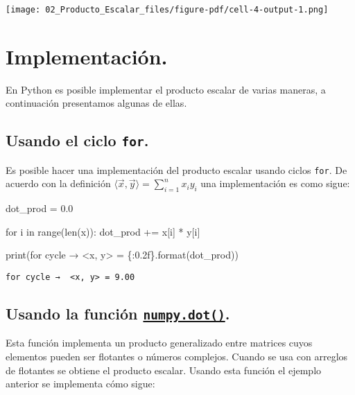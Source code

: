\documentclass[
  letterpaper,
  DIV=11,
  numbers=noendperiod]{scrreprt}
\newenvironment{Shaded}{\begin{snugshade}}{\end{snugshade}}
\newcommand{\BuiltInTok}[1]{\textcolor[rgb]{0.00,0.23,0.31}{#1}}
\newcommand{\ControlFlowTok}[1]{\textcolor[rgb]{0.00,0.23,0.31}{#1}}
\newcommand{\FloatTok}[1]{\textcolor[rgb]{0.68,0.00,0.00}{#1}}
\newcommand{\KeywordTok}[1]{\textcolor[rgb]{0.00,0.23,0.31}{#1}}
\newcommand{\NormalTok}[1]{\textcolor[rgb]{0.00,0.23,0.31}{#1}}
\newcommand{\OperatorTok}[1]{\textcolor[rgb]{0.37,0.37,0.37}{#1}}
\newcommand{\SpecialCharTok}[1]{\textcolor[rgb]{0.37,0.37,0.37}{#1}}
\newcommand{\StringTok}[1]{\textcolor[rgb]{0.13,0.47,0.30}{#1}}
\begin{document}
\texttt{[image: 02\_Producto\_Escalar\_files/figure-pdf/cell-4-output-1.png]}

\section{Implementación.}\label{implementaciuxf3n.}

En Python es posible implementar el producto escalar de varias maneras,
a continuación presentamos algunas de ellas.

\subsection{\texorpdfstring{Usando el ciclo
\texttt{for}.}{Usando el ciclo for.}}\label{usando-el-ciclo-for.}

Es posible hacer una implementación del producto escalar usando ciclos
\texttt{for}. De acuerdo con la definición
\(\langle \vec{x}, \vec{y} \rangle = \sum_{i=1}^n x_i y_i\) una
implementación es como sigue:

\begin{Shaded}
\begin{Highlighting}[]
\NormalTok{dot\_prod }\OperatorTok{=} \FloatTok{0.0}

\ControlFlowTok{for}\NormalTok{ i }\KeywordTok{in} \BuiltInTok{range}\NormalTok{(}\BuiltInTok{len}\NormalTok{(x)):}
\NormalTok{    dot\_prod }\OperatorTok{+=}\NormalTok{ x[i] }\OperatorTok{*}\NormalTok{ y[i]}
    
\BuiltInTok{print}\NormalTok{(}\StringTok{\textquotesingle{}for cycle →  \textless{}x, y\textgreater{} = }\SpecialCharTok{\{:0.2f\}}\StringTok{\textquotesingle{}}\NormalTok{.}\BuiltInTok{format}\NormalTok{(dot\_prod))}
\end{Highlighting}
\end{Shaded}

\begin{verbatim}
for cycle →  <x, y> = 9.00
\end{verbatim}

\subsection{\texorpdfstring{Usando la función
\href{https://numpy.org/doc/stable/reference/generated/numpy.dot.html}{\texttt{numpy.dot()}}.}{Usando la función numpy.dot().}}\label{usando-la-funciuxf3n-numpy.dot.}

Esta función implementa un producto generalizado entre matrices cuyos
elementos pueden ser flotantes o números complejos. Cuando se usa con
arreglos de flotantes se obtiene el producto escalar. Usando esta
función el ejemplo anterior se implementa cómo sigue:
\end{document}
